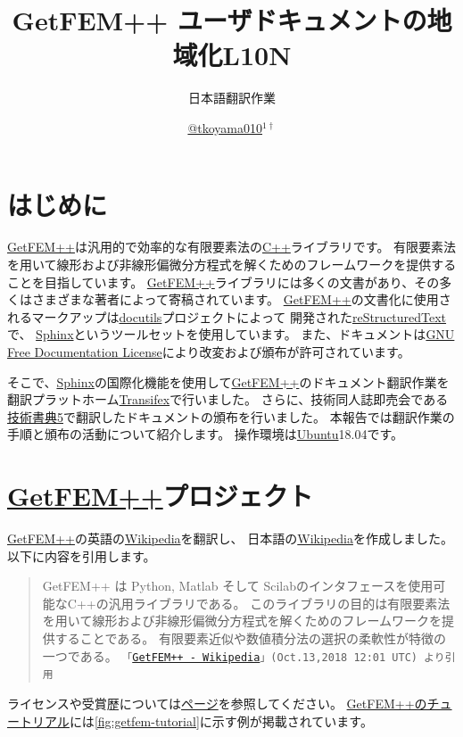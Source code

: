 \documentclass{../../style/ltjoc}
\title{GetFEM++ ユーザドキュメントの地域化L10N}
\subtitle{日本語翻訳作業}
\author{%
\href{https://twitter.com/tkoyama010}{@tkoyama010}$^{1\dagger}$%
}
\affiliation{%
${}^{1}$\href{https://tkoyama010.github.io/getfem-docs-html-ja/}{GetFEM++ Japanese Team}%
}
\begin{document}
\maketitle
\section{はじめに}
\href{http://getfem.org}{GetFEM++}は汎用的で効率的な有限要素法の\href{https://isocpp.org/}{C++}ライブラリです。
有限要素法を用いて線形および非線形偏微分方程式を解くためのフレームワークを提供することを目指しています。
\href{http://getfem.org}{GetFEM++}ライブラリには多くの文書があり、その多くはさまざまな著者によって寄稿されています。
\href{http://getfem.org}{GetFEM++}の文書化に使用されるマークアップは\href{http://docutils.sourceforge.net/}{docutils}プロジェクトによって
開発された\href{http://docutils.sourceforge.net/rst.html}{reStructuredText}で、
\href{http://www.sphinx-doc.org/ja/stable/}{Sphinx}というツールセットを使用しています。
また、ドキュメントは\href{https://www.gnu.org/licenses/fdl.html}{GNU Free Documentation License}により改変および頒布が許可されています。

そこで、\href{http://www.sphinx-doc.org/ja/stable/}{Sphinx}の国際化機能を使用して\href{http://getfem.org}{GetFEM++}のドキュメント翻訳作業を
翻訳プラットホーム\href{https://www.transifex.com}{Transifex}で行いました。
さらに、技術同人誌即売会である\href{https://techbookfest.org/event/tbf05}{技術書典5}で翻訳したドキュメントの頒布を行いました。
本報告では翻訳作業の手順と頒布の活動について紹介します。
操作環境は\href{https://www.ubuntu.com/}{Ubuntu}18.04です。

\section{\href{http://getfem.org}{GetFEM++}プロジェクト}
\href{http://getfem.org}{GetFEM++}の英語の\href{https://en.wikipedia.org/wiki/GetFEM++}{Wikipedia}を翻訳し、
日本語の\href{https://ja.wikipedia.org/wiki/GetFEM++}{Wikipedia}を作成しました。
以下に内容を引用します。

\begin{quote}
GetFEM++ は Python, Matlab そして Scilabのインタフェースを使用可能なC++の汎用ライブラリである。
このライブラリの目的は有限要素法を用いて線形および非線形偏微分方程式を解くためのフレームワークを提供することである。
有限要素近似や数値積分法の選択の柔軟性が特徴の一つである。
\texttt{「\href{https://ja.wikipedia.org/wiki/GetFEM++}{GetFEM++ - Wikipedia}」(Oct.13,2018 12:01 UTC) より引用}
\end{quote}
ライセンスや受賞歴については\href{https://ja.wikipedia.org/wiki/GetFEM++}{ページ}を参照してください。
\href{http://www.getfem.org/tutorial/index.html}{GetFEM++のチュートリアル}には\autoref{fig:getfem-tutorial}に示す例が掲載されています。
\end{document}
